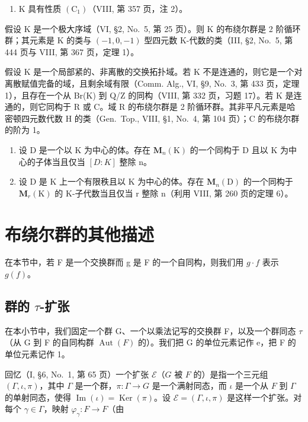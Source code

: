 \begin{enumerate}
\def\labelenumi{\alph{enumi})}
\setcounter{enumi}{2}
\tightlist
\item
  K 具有性质 \((\mathrm{C}_1)\)（VIII, 第 357 页，注 2）。
\end{enumerate}

假设 K 是一个极大序域（VI, §2, No.~5, 第 25 页）。则 K 的布绕尔群是 2 阶循环群；其元素是 K 的类与 \((-1,0,-1)\) 型四元数 K-代数的类（III, §2, No.~5, 第 444 页与 VIII, 第 367 页，定理 1）。

假设 K 是一个局部紧的、非离散的交换拓扑域。若 K 不是连通的，则它是一个对离散赋值完备的域，且剩余域有限（Comm. Alg., VI, §9, No.~3, 第 433 页，定理 1），且存在一个从 Br(K) 到 Q/Z 的同构（VIII, 第 332 页，习题 17）。若 K 是连通的，则它同构于 R 或 C。域 R 的布绕尔群是 2 阶循环群。其非平凡元素是哈密顿四元数代数 H 的类（Gen.~Top., VIII, §1, No.~4, 第 104 页）；C 的布绕尔群的阶为 1。


\begin{enumerate}
\def\labelenumi{\arabic{enumi})}
\item
  设 D 是一个以 K 为中心的体。存在 \(\mathbf{M}_{n}(\mathrm{K})\) 的一个同构于 D 且以 K 为中心的子体当且仅当 \([D:K]\) 整除 n。
\item
  设 D 是 K 上一个有限秩且以 K 为中心的体。存在 \(\mathbf{M}_{n}(\mathrm{D})\) 的一个同构于 \(\mathbf{M}_{r}(\mathrm{K})\) 的 K-子代数当且仅当 r 整除 n（利用 VIII, 第 260 页的定理 6）。
\end{enumerate}

\section{布绕尔群的其他描述}

在本节中，若 F 是一个交换群而 g 是 F 的一个自同构，则我们用 \(g \cdot f\) 表示 \(g(f)\)。

\subsection{\texorpdfstring{群的 \(\tau\)-扩张}{群的 \textbackslash tau-扩张}}

在本小节中，我们固定一个群 G、一个以乘法记写的交换群 F，以及一个群同态 \(\tau\)（从 G 到 F 的自同构群 \(\operatorname{Aut}(F)\) 的）。我们把 G 的单位元素记作 e，把 F 的单位元素记作 1。

回忆（I, §6, No.~1, 第 65 页）一个扩张 \(\mathcal{E}\)（\(G\) 被 \(F\) 的）是指一个三元组 \((\Gamma, \iota, \pi)\)，其中 \(\Gamma\) 是一个群，\(\pi: \Gamma \to G\) 是一个满射同态，而 \(\iota\) 是一个从 \(F\) 到 \(\Gamma\) 的单射同态，使得 \(\operatorname{Im}(\iota) = \operatorname{Ker}(\pi)\)。设 \(\mathcal{E} = (\Gamma, \iota, \pi)\) 是这样一个扩张。对每个 \(\gamma \in \Gamma\)，映射 \(\varphi_{\gamma}: F \to F\)（由

